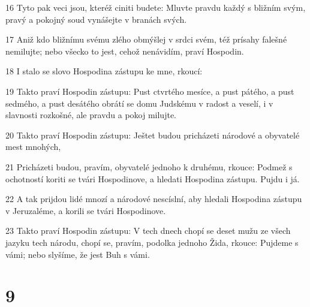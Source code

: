 \par 16 Tyto pak veci jsou, kteréž ciniti budete: Mluvte pravdu každý s bližním svým, pravý a pokojný soud vynášejte v branách svých.
\par 17 Aniž kdo bližnímu svému zlého obmýšlej v srdci svém, též prísahy falešné nemilujte; nebo všecko to jest, cehož nenávidím, praví Hospodin.
\par 18 I stalo se slovo Hospodina zástupu ke mne, rkoucí:
\par 19 Takto praví Hospodin zástupu: Pust ctvrtého mesíce, a pust pátého, a pust sedmého, a pust desátého obrátí se domu Judskému v radost a veselí, i v slavnosti rozkošné, ale pravdu a pokoj milujte.
\par 20 Takto praví Hospodin zástupu: Ještet budou pricházeti národové a obyvatelé mest mnohých,
\par 21 Pricházeti budou, pravím, obyvatelé jednoho k druhému, rkouce: Podmež s ochotností koriti se tvári Hospodinove, a hledati Hospodina zástupu. Pujdu i já.
\par 22 A tak prijdou lidé mnozí a národové nescíslní, aby hledali Hospodina zástupu v Jeruzaléme, a korili se tvári Hospodinove.
\par 23 Takto praví Hospodin zástupu: V tech dnech chopí se deset mužu ze všech jazyku tech národu, chopí se, pravím, podolka jednoho Žida, rkouce: Pujdeme s vámi; nebo slyšíme, že jest Buh s vámi.

\chapter{9}

